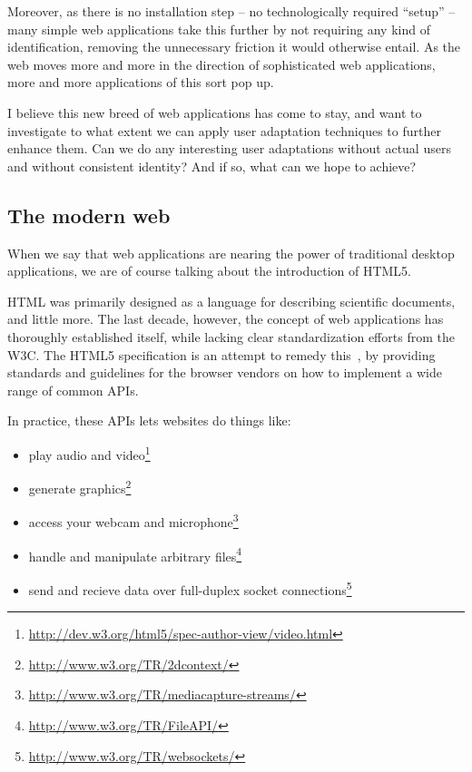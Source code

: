 Moreover, as there is no installation step -- no technologically required ``setup'' -- many simple web applications take this further by not requiring any kind of identification, removing the unnecessary friction it would otherwise entail. As the web moves more and more in the direction of sophisticated web applications, more and more applications of this sort pop up.

I believe this new breed of web applications has come to stay, and want to investigate to what extent we can apply user adaptation techniques to further enhance them. Can we do any interesting user adaptations without actual users and without consistent identity? And if so, what can we hope to achieve?

\subsection{The modern web}
\label{intro:sub:the_modern_web}

When we say that web applications are nearing the power of traditional desktop applications, we are of course talking about the introduction of HTML5.

HTML was primarily designed as a language for describing scientific documents, and little more. The last decade, however, the concept of web applications has thoroughly established itself, while lacking clear standardization efforts from the W3C. The HTML5 specification is an attempt to remedy this~\cite{W3CHTML5_intro}, by providing standards and guidelines for the browser vendors on how to implement a wide range of common APIs.

In practice, these APIs lets websites do things like:

\begin{itemize}
    \item play audio and video\footnote{\url{http://dev.w3.org/html5/spec-author-view/video.html}}
    \item generate graphics\footnote{\url{http://www.w3.org/TR/2dcontext/}}
    \item access your webcam and microphone\footnote{\url{http://www.w3.org/TR/mediacapture-streams/}}
    \item handle and manipulate arbitrary files\footnote{\url{http://www.w3.org/TR/FileAPI/}}
    \item send and recieve data over full-duplex socket connections\footnote{\url{http://www.w3.org/TR/websockets/}}
\end{itemize}

